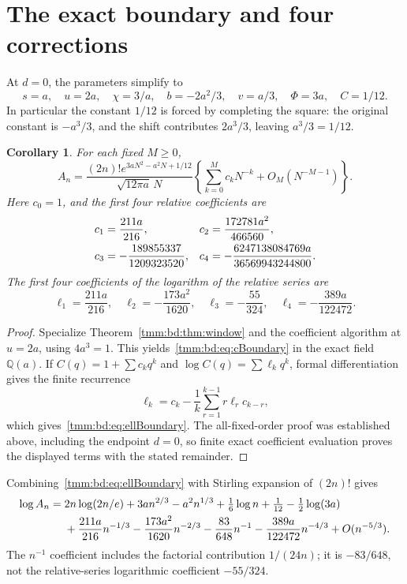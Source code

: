\documentclass[11pt,letterpaper]{article}
\newtheorem{corollary}[theorem]{Corollary}
\theoremstyle{remark}\newtheorem{remark}[theorem]{Remark}
\begin{document}
\section{The exact boundary and four corrections}\label{tmm:bd:sec:boundary}
At $d=0$, the parameters simplify to
\[
 s=a,\quad u=2a,\quad\chi=3/a,\quad b=-2a^2/3,\quad v=a/3,
 \quad\Phi=3a,\quad C=1/12.
\]
In particular the constant $1/12$ is forced by completing the square: the original constant is $-a^3/3$, and the shift contributes $2a^3/3$, leaving $a^3/3=1/12$.

\begin{corollary}\label{tmm:bd:cor:boundary}
For each fixed $M\ge0$,
\begin{equation}\label{tmm:bd:eq:boundaryasym}
 A_n=\frac{(2n)!e^{3aN^2-a^2N+1/12}}{\sqrt{12\pi a}\,N}
       \left\{\sum_{k=0}^Mc_kN^{-k}+O_M(N^{-M-1})\right\}.
\end{equation}
Here $c_0=1$, and the first four relative coefficients are
\begin{align}
 c_1&=\frac{211a}{216},&
 c_2&=\frac{172781a^2}{466560},\notag\\
 c_3&=-\frac{189855337}{1209323520},&
 c_4&=-\frac{6247138084769a}{36569943244800}.\label{tmm:bd:eq:cBoundary}
\end{align}
The first four coefficients of the logarithm of the relative series are
\begin{equation}\label{tmm:bd:eq:ellBoundary}
 \ell_1=\frac{211a}{216},\quad
 \ell_2=-\frac{173a^2}{1620},\quad
 \ell_3=-\frac{55}{324},\quad
 \ell_4=-\frac{389a}{122472}.
\end{equation}
\end{corollary}
\begin{proof}
Specialize Theorem~\ref{tmm:bd:thm:window} and the coefficient algorithm at $u=2a$, using $4a^3=1$. This yields~\eqref{tmm:bd:eq:cBoundary} in the exact field $\mathbb Q(a)$. If $C(q)=1+\sum c_kq^k$ and $\log C(q)=\sum\ell_kq^k$, formal differentiation gives the finite recurrence
\[
 \ell_k=c_k-\frac1k\sum_{r=1}^{k-1}r\ell_rc_{k-r},
\]
which gives~\eqref{tmm:bd:eq:ellBoundary}. The all-fixed-order proof was established above, including the endpoint $d=0$, so finite exact coefficient evaluation proves the displayed terms with the stated remainder.
\end{proof}

Combining~\eqref{tmm:bd:eq:ellBoundary} with Stirling expansion of $(2n)!$ gives
\begin{align}
 \log A_n={}&2n\log(2n/e)+3an^{2/3}-a^2n^{1/3}+\tfrac16\log n
       +\tfrac1{12}-\tfrac12\log(3a)\notag\\
 &+\frac{211a}{216}n^{-1/3}-\frac{173a^2}{1620}n^{-2/3}
       -\frac{83}{648}n^{-1}
       -\frac{389a}{122472}n^{-4/3}+O(n^{-5/3}).\label{tmm:bd:eq:logBoundary}
\end{align}
The $n^{-1}$ coefficient includes the factorial contribution $1/(24n)$; it is $-83/648$, not the relative-series logarithmic coefficient $-55/324$.
\end{document}
